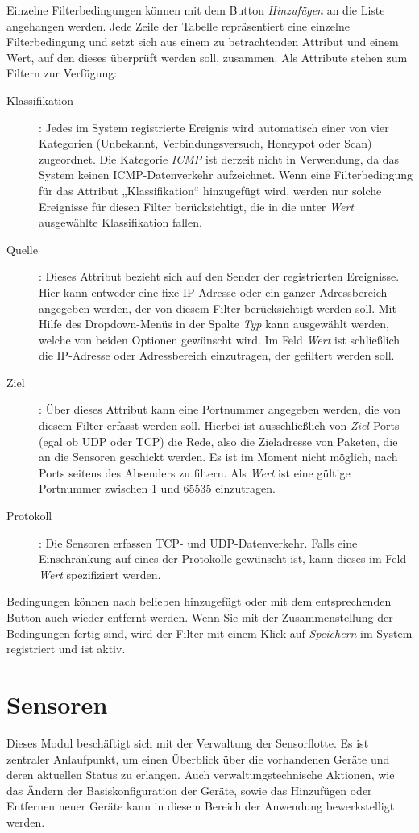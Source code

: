 \documentclass[12pt]{article}
\begin{document}
Einzelne Filterbedingungen können mit dem Button \textit{Hinzufügen} an die Liste angehangen werden. Jede Zeile der Tabelle repräsentiert eine einzelne Filterbedingung und setzt sich aus einem zu betrachtenden Attribut und einem Wert, auf den dieses überprüft werden soll, zusammen. Als Attribute stehen zum Filtern zur Verfügung:
\begin{description}
				\item[Klassifikation]: Jedes im System registrierte Ereignis wird automatisch einer von vier Kategorien (Unbekannt, Verbindungsversuch, Honeypot oder Scan) zugeordnet. Die Kategorie \textit{ICMP} ist derzeit nicht in Verwendung, da das System keinen ICMP-Datenverkehr aufzeichnet. Wenn eine Filterbedingung für das Attribut „Klassifikation“ hinzugefügt wird, werden nur solche Ereignisse für diesen Filter berücksichtigt, die in die unter \textit{Wert} ausgewählte Klassifikation fallen.
				\item[Quelle]: Dieses Attribut bezieht sich auf den Sender der registrierten Ereignisse. Hier kann entweder eine fixe IP-Adresse oder ein ganzer Adressbereich angegeben werden, der von diesem Filter berücksichtigt werden soll. Mit Hilfe des Dropdown-Menüs in der Spalte \textit{Typ} kann ausgewählt werden, welche von beiden Optionen gewünscht wird. Im Feld \textit{Wert} ist schließlich die IP-Adresse oder Adressbereich einzutragen, der gefiltert werden soll.
				\item[Ziel]: Über dieses Attribut kann eine Portnummer angegeben werden, die von diesem Filter erfasst werden soll. Hierbei ist ausschließlich von \textit{Ziel-}Ports (egal ob UDP oder TCP) die Rede, also die Zieladresse von Paketen, die an die Sensoren geschickt werden. Es ist im Moment nicht möglich, nach Ports seitens des Absenders zu filtern. Als \textit{Wert} ist eine gültige Portnummer zwischen 1 und 65535 einzutragen.
				\item[Protokoll]: Die Sensoren erfassen TCP- und UDP-Datenverkehr. Falls eine Einschränkung auf eines der Protokolle gewünscht ist, kann dieses im Feld \textit{Wert} spezifiziert werden.
\end{description}

Bedingungen können nach belieben hinzugefügt oder mit dem entsprechenden Button auch wieder entfernt werden. Wenn Sie mit der Zusammenstellung der Bedingungen fertig sind, wird der Filter mit einem Klick auf \textit{Speichern} im System registriert und ist aktiv.

\section{Sensoren}
Dieses Modul beschäftigt sich mit der Verwaltung der Sensorflotte. Es ist zentraler Anlaufpunkt, um einen Überblick über die vorhandenen Geräte und deren aktuellen Status zu erlangen. Auch verwaltungstechnische Aktionen, wie das Ändern der Basiskonfiguration der Geräte, sowie das Hinzufügen oder Entfernen neuer Geräte kann in diesem Bereich der Anwendung bewerkstelligt werden.
\end{document}
